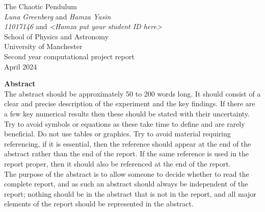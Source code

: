 \documentclass[11pt]{article} %
\begin{document}

\begin{titlepage} %
\begin{center} %

{\Huge The Chaotic Pendulum}\\[0.5cm] %
\textit{Luna Greenberg} and \textit{Hamza Yasin}~\\[0.3cm] %
\textit{11017146} and \textit{<Hamza put your student ID here>}~\\[0.3cm]
School of Physics and Astronomy~\\[0.3cm]
University of Manchester~\\[0.3cm]
Second year computational project report~\\[0.3cm]
April 2024~\\[2cm]


\end{center}
{\Large \textbf{Abstract}}~\\[0.3cm]

 The abstract should be approximately 50 to 200 words long. It should consist of a clear and precise description of the experiment and the key findings. If there are a few key numerical results then these should be stated with their uncertainty. Try to avoid symbols or equations as these take time to define and are rarely beneficial. Do not use tables or graphics. Try to avoid material requiring referencing, if it is essential, then the reference should appear at the end of the abstract rather than the end of the report. If the same reference is used in the report proper, then it should also be referenced at the end of the report.\\

 The purpose of the abstract is to allow someone to decide whether to read the complete report, and as such an abstract should always be independent of the report; nothing should be in the abstract that is not in the report, and all major elements of the report should be represented in the abstract.


\end{titlepage}
\clearpage
{} %
\setcounter{page}{2} %
\end{document}
